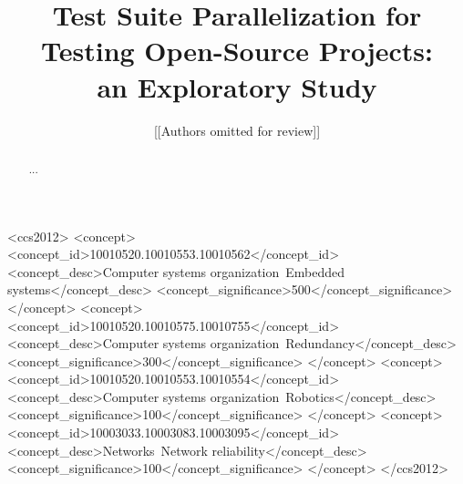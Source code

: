 \documentclass[sigconf]{acmart}
\begin{document}






\title{Test Suite Parallelization for Testing Open-Source Projects:\\ an
Exploratory Study}





\author{[[Authors omitted for review]]}


\begin{abstract}
  ...
\end{abstract}


\begin{CCSXML}
<ccs2012>
 <concept>
  <concept_id>10010520.10010553.10010562</concept_id>
  <concept_desc>Computer systems organization~Embedded systems</concept_desc>
  <concept_significance>500</concept_significance>
 </concept>
 <concept>
  <concept_id>10010520.10010575.10010755</concept_id>
  <concept_desc>Computer systems organization~Redundancy</concept_desc>
  <concept_significance>300</concept_significance>
 </concept>
 <concept>
  <concept_id>10010520.10010553.10010554</concept_id>
  <concept_desc>Computer systems organization~Robotics</concept_desc>
  <concept_significance>100</concept_significance>
 </concept>
 <concept>
  <concept_id>10003033.10003083.10003095</concept_id>
  <concept_desc>Networks~Network reliability</concept_desc>
  <concept_significance>100</concept_significance>
 </concept>
</ccs2012>  
\end{CCSXML}
\end{document}
